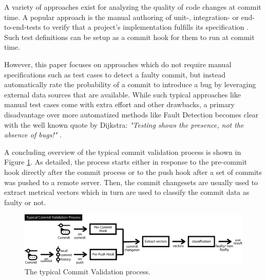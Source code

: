 A variety of approaches exist
for analyzing the quality of code changes at commit time. A popular approach is the manual authoring of unit-, integration- or end-to-end-tests to verify that a project's implementation fulfills its specification \cite{Maayan2018}. Such test definitions can be setup as a commit hook for them to run at commit time.

However, this paper focuses on approaches which do not require manual specifications such as test cases to detect a faulty commit, but instead automatically rate the probability of a commit to introduce a bug by leveraging external data sources that are available.
While such typical approaches like manual test cases come with extra effort and other drawbacks, a primary disadvantage over more automatized methods like Fault Detection becomes clear with the well known quote by Dijkstra: \textit{"Testing shows the presence, not the absence of bugs!"} \cite[p.~16]{JohnN1969}.

A concluding overview of the typical commit validation process is shown in Figure \ref{fig:cvprocess}. As detailed, the process starts either in response to the pre-commit hook directly after the commit process or to the push hook after a set of commits was pushed to a remote server. Then, the commit changesets are usually used to extract metrical vectors which in turn are used to classify the commit data as faulty or not.

\begin{figure}[t]
	\centering
	\includegraphics[width=\textwidth]{images/commitvalidation-process/typicalprocess-pdf}
	\caption{The typical Commit Validation process.}
	\label{fig:cvprocess}
\end{figure}

